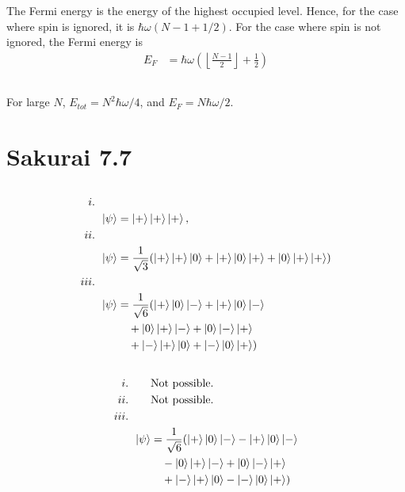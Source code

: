 \documentclass[
a4paper,
10pt,
twoside,
]{article}
\begin{document}
The Fermi energy is the energy of the highest occupied level.
Hence, for the case where spin is ignored, it is $\hbar\omega(N-1 + 1/2)$.
For the case where spin is not ignored, the Fermi energy is
\begin{align}
	E_F &= \hbar\omega\left(\left\lfloor \frac{N-1}{2} \right\rfloor + \frac{1}{2}\right)
\end{align}

\subsection{} \label{ssec: IB}


For large $N$, $E_{tot} = N^2\hbar\omega/4$, and $E_F = N\hbar\omega/2$.


\section{Sakurai 7.7}\label{sec: II}


\subsection{}\label{ssec: IIA}


\begin{align}
	i.\qquad&\nonumber\\
	\ket{\psi} &= \ket{+}\ket{+}\ket{+},\\
	ii.\qquad&\nonumber\\
	\ket{\psi} &= \frac{1}{\sqrt{3}}(\ket{+}\ket{+}\ket{0} + \ket{+}\ket{0}\ket{+} + \ket{0}\ket{+}\ket{+})\\
	iii.\qquad&\nonumber\\
	\ket{\psi} &= \frac{1}{\sqrt{6}}(\ket{+}\ket{0}\ket{-} + \ket{+}\ket{0}\ket{-}\nonumber\\
	&\quad + \ket{0}\ket{+}\ket{-} + \ket{0}\ket{-}\ket{+}\nonumber\\
	&\quad + \ket{-}\ket{+}\ket{0} + \ket{-}\ket{0}\ket{+})
\end{align}
\subsection{}\label{ssec: IIB}
\begin{align}
	i.\qquad&\text{Not possible.}\nonumber\\
	ii.\qquad&\text{Not possible.}\nonumber\\
	iii.\qquad&\nonumber\\
	\ket{\psi} &= \frac{1}{\sqrt{6}}(\ket{+}\ket{0}\ket{-} - \ket{+}\ket{0}\ket{-}\nonumber\\
	&\quad - \ket{0}\ket{+}\ket{-} + \ket{0}\ket{-}\ket{+}\nonumber\\
	&\quad + \ket{-}\ket{+}\ket{0} - \ket{-}\ket{0}\ket{+})
\end{align}
\end{document}
